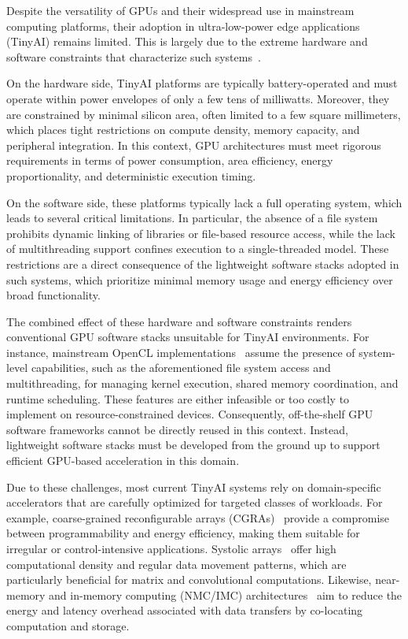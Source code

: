         Despite the versatility of GPUs and their widespread use in mainstream computing platforms, their adoption in ultra-low-power edge applications (TinyAI) remains limited. This is largely due to the extreme hardware and software constraints that characterize such systems~\cite{co-design_vision}.
    
        On the hardware side, TinyAI platforms are typically battery-operated and must operate within power envelopes of only a few tens of milliwatts. Moreover, they are constrained by minimal silicon area, often limited to a few square millimeters, which places tight restrictions on compute density, memory capacity, and peripheral integration. In this context, GPU architectures must meet rigorous requirements in terms of power consumption, area efficiency, energy proportionality, and deterministic execution timing.
    
        On the software side, these platforms typically lack a full operating system, which leads to several critical limitations. In particular, the absence of a file system prohibits dynamic linking of libraries or file-based resource access, while the lack of multithreading support confines execution to a single-threaded model. These restrictions are a direct consequence of the lightweight software stacks adopted in such systems, which prioritize minimal memory usage and energy efficiency over broad functionality.
    
        The combined effect of these hardware and software constraints renders conventional GPU software stacks unsuitable for TinyAI environments. For instance, mainstream OpenCL implementations~\cite{pocl} assume the presence of system-level capabilities, such as the aforementioned file system access and multithreading, for managing kernel execution, shared memory coordination, and runtime scheduling. These features are either infeasible or too costly to implement on resource-constrained devices. Consequently, off-the-shelf GPU software frameworks cannot be directly reused in this context. Instead, lightweight software stacks must be developed from the ground up to support efficient GPU-based acceleration in this domain.
    
        Due to these challenges, most current TinyAI systems rely on domain-specific accelerators that are carefully optimized for targeted classes of workloads. For example, coarse-grained reconfigurable arrays (CGRAs)~\cite{oe-cgra, vwr2a} provide a compromise between programmability and energy efficiency, making them suitable for irregular or control-intensive applications. Systolic arrays~\cite{cnn-accel} offer high computational density and regular data movement patterns, which are particularly beneficial for matrix and convolutional computations. Likewise, near-memory and in-memory computing (NMC/IMC) architectures~\cite{nmc, blade, maxwell} aim to reduce the energy and latency overhead associated with data transfers by co-locating computation and storage.
    
